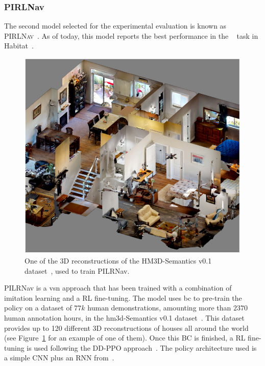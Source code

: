 \subsubsection{PIRLNav}
The second model selected for the experimental evaluation is known as \textsc{PIRLNav}~\cite{ramrakhya2023}.
As of today, this model reports the best performance in the \objnav~\cite{batra2020} task in Habitat~\cite{NEURIPS2021_021bbc7e}.

\begin{figure}[t]
    \centering
    \includegraphics[width=\linewidth]{figures/ros4vsn/dataset_scene}
    \caption{One of the 3D reconstructions of the HM3D-Semantics v0.1 dataset~\cite{Ramakrishnan2021HabitatMatterport3D}, used to train PILRNav.}
    \label{fig:scene_hm3d}
\end{figure}

PILRNav is a \acrshort{vsn} approach that has been trained with a combination of imitation learning and a RL fine-tuning.
The model uses \acrshort{bc} to pre-train the \objnav policy on a dataset of $77k$ human demonstrations, amounting more than $2370$ human annotation hours, in the \acrshort{hm3d}-Semantics v0.1 dataset~\cite{Ramakrishnan2021HabitatMatterport3D}.
This dataset provides up to 120 different 3D reconstructions of houses all around the world (see Figure~\ref{fig:scene_hm3d} for an example of one of them).
Once this BC is finished, a RL fine-tuning is used following the DD-PPO approach~\cite{Wijmans2019DDPPOLN}.
The policy architecture used is a simple CNN plus an RNN from~\cite{yadav2022}.

